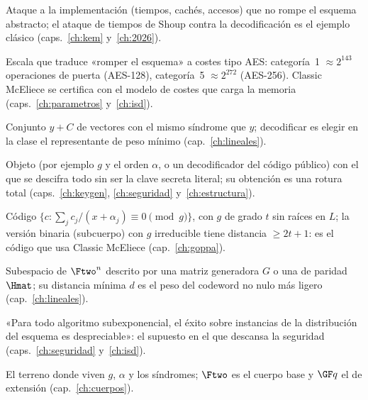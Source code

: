 \begin{description}[leftmargin=2.6em,style=nextline,itemsep=2.5pt,parsep=0pt]
  \item[\textbf{Canal lateral}]
        Ataque a la implementación (tiempos, cachés, accesos)
        que no rompe el esquema abstracto; el ataque de tiempos de
        Shoup contra la decodificación es el ejemplo clásico
        (caps.~\ref{ch:kem} y~\ref{ch:2026}).

  \item[\textbf{Categorías (NIST)}]
        Escala que traduce «romper el esquema» a costes tipo AES:
        categoría~1 $\approx2^{143}$ operaciones de puerta
        (AES-128), categoría~5 $\approx2^{272}$ (AES-256). Classic
        McEliece se certifica con el modelo de costes que carga la
        memoria (caps.~\ref{ch:parametros} y~\ref{ch:isd}).

  \item[\textbf{Clase lateral}]
        Conjunto $y+C$ de vectores con el mismo síndrome que $y$;
        decodificar es elegir en la clase el representante de peso
        mínimo (cap.~\ref{ch:lineales}).

  \item[\textbf{Clave equivalente}]
        Objeto (por ejemplo $g$ y el orden $\alpha$, o un
        decodificador del código público) con el que se descifra
        todo sin ser la clave secreta literal; su obtención es una
        rotura total (caps.~\ref{ch:keygen}, \ref{ch:seguridad}
        y~\ref{ch:estructura}).

  \item[\textbf{Código de Goppa} ($\Gamma_2(L,g)$)]
        Código $\{c:\sum_j c_j/(x+\alpha_j)\equiv0\pmod g\}$, con
        $g$ de grado $t$ sin raíces en $L$; la versión binaria
        (subcuerpo) con $g$ irreducible tiene distancia
        $\ge2t+1$: es el código que usa Classic McEliece
        (cap.~\ref{ch:goppa}).

  \item[\textbf{Código lineal}]
        Subespacio de $\Ftwo^n$ descrito por una matriz generadora
        $G$ o una de paridad $\Hmat$; su distancia mínima $d$ es
        el peso del codeword no nulo más ligero
        (cap.~\ref{ch:lineales}).

  \item[\textbf{Conjetura de dureza (SD en media)}]
        «Para todo algoritmo subexponencial, el éxito sobre
        instancias de la distribución del esquema es
        despreciable»: el supuesto en el que descansa la seguridad
        (caps.~\ref{ch:seguridad} y~\ref{ch:isd}).

  \item[\textbf{Cuerpo finito} ($\GF q$ con $q=2^m$; $\Ftwo$)]
        El terreno donde viven $g$, $\alpha$ y los síndromes;
        $\Ftwo$ es el cuerpo base y $\GF q$ el de extensión
        (cap.~\ref{ch:cuerpos}).


\end{description}
